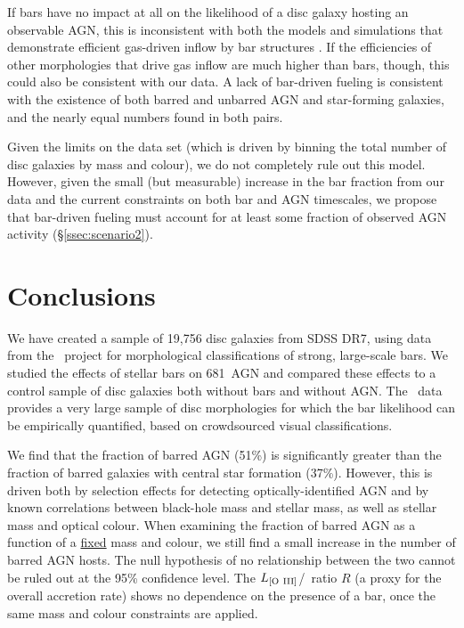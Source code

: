 If bars have no impact at all on the likelihood of a disc galaxy hosting an observable AGN, this is inconsistent with both the models and simulations that demonstrate efficient gas-driven inflow by bar structures \citep{Hopkins2010}. If the efficiencies of other morphologies that drive gas inflow are much higher than bars, though, this could also be consistent with our data. A lack of bar-driven fueling is consistent with the existence of both barred and unbarred AGN and star-forming galaxies, and the nearly equal numbers found in both pairs. 

Given the limits on the data set (which is driven by binning the total number of disc galaxies by mass and colour), we do not completely rule out this model. However, given the small (but measurable) increase in the bar fraction from our data and the current constraints on both bar and AGN timescales, we propose that bar-driven fueling must account for at least some fraction of observed AGN activity (\S\ref{ssec:scenario2}).
 
\section{Conclusions}
\label{sec:conclusions}
We have created a sample of 19,756 disc galaxies from SDSS DR7, using data from the \gztwo~project for morphological classifications of strong, large-scale bars. We studied the effects of stellar bars on 681~AGN and compared these effects to a control sample of disc galaxies both without bars and without AGN. The \gztwo~data provides a very large sample of disc morphologies for which the bar likelihood can be empirically quantified, based on crowdsourced visual classifications. 


We find that the fraction of barred AGN (51\%) is significantly greater than the fraction of barred galaxies with central star formation (37\%). However, this is driven both by selection effects for detecting optically-identified AGN and by known correlations between black-hole mass and stellar mass, as well as stellar mass and optical colour. When examining the fraction of barred AGN as a function of a \underline{fixed} mass and colour, we still find a small increase in the number of barred AGN hosts. The null hypothesis of no relationship between the two cannot be ruled out at the 95\% confidence level. The $L_{\rm{[O~III]}}$/\mbh~ratio $R$ (a proxy for the overall accretion rate) shows no dependence on the presence of a bar, once the same mass and colour constraints are applied.

